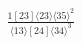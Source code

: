 \documentclass[varwidth, border=5pt]{standalone}
\begin{document}
\begin{my}
$\begin{gathered}
\scriptscriptstyle\frac{1[23]⟨23⟩⟨35⟩^2}{⟨13⟩[24]⟨34⟩^3}
\end{gathered}$
\end{my}
\end{document}
